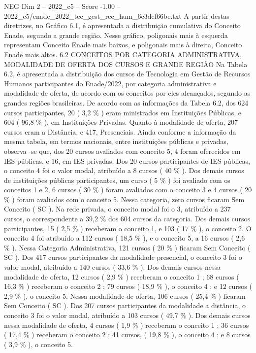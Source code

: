 \begin{textsample}{NEG Dim 2 – 2022\_c5 – Score -1.00 – 2022\_c5/enade\_2022\_tec\_gest\_rec\_hum\_6c3def66be.txt}
A partir destas diretrizes, no Gráfico 6.1, é apresentada a distribuição cumulativa do Conceito Enade, segundo a grande região.
Nesse gráfico, poligonais mais à esquerda representam Conceito Enade mais baixos, e poligonais mais à direita, Conceito Enade mais altos. 6.2 CONCEITOS POR CATEGORIA ADMINISTRATIVA, MODALIDADE DE OFERTA DOS CURSOS E GRANDE REGIÃO Na Tabela 6.2, é apresentada a distribuição dos cursos de Tecnologia em Gestão de Recursos Humanos participantes do Enade/2022, por categoria administrativa e modalidade de oferta, de acordo com os conceitos por eles alcançados, segundo as grandes regiões brasileiras.
De acordo com as informações da Tabela 6.2, dos 624 cursos participantes, 20 ( 3,2 \% ) eram ministrados em Instituições Públicas, e 604 ( 96,8 \% ), em Instituições Privadas.
Quanto à modalidade de oferta, 207 cursos eram a Distância, e 417, Presenciais.
Ainda conforme a informação da mesma tabela, em termos nacionais, entre instituições públicas e privadas, observa -se que, dos 20 cursos avaliados com conceito 5, 4 foram oferecidos em IES públicas, e 16, em IES privadas.
Dos 20 cursos participantes de IES públicas, o conceito 4 foi o valor modal, atribuído a 8 cursos ( 40 \% ).
Dos demais cursos de instituições públicas participantes, um curso ( 5 \% ) foi avaliado com os conceitos 1 e 2, 6 cursos ( 30 \% ) foram avaliados com o conceito 3 e 4 cursos ( 20 \% ) foram avaliados com o conceito 5.
Nessa categoria, zero cursos ficaram Sem Conceito ( SC ).
Na rede privada, o conceito modal foi o 3, atribuído a 237 cursos, o correspondente a 39,2 \% dos 604 cursos da categoria.
Dos demais cursos participantes, 15 ( 2,5 \% ) receberam o conceito 1, e 103 ( 17 \% ), o conceito 2.
O conceito 4 foi atribuído a 112 cursos ( 18,5 \% ), e o conceito 5, a 16 cursos ( 2,6 \% ).
Nessa Categoria Administrativa, 121 cursos ( 20 \% ) ficaram Sem Conceito ( SC ).
Dos 417 cursos participantes da modalidade presencial, o conceito 3 foi o valor modal, atribuído a 140 cursos ( 33,6 \% ).
Dos demais cursos nessa modalidade de oferta, 12 cursos ( 2,9 \% ) receberam o conceito 1 ; 68 cursos ( 16,3 \% ) receberam o conceito 2 ; 79 cursos ( 18,9 \% ), o conceito 4 ; e 12 cursos ( 2,9 \% ), o conceito 5.
Nessa modalidade de oferta, 106 cursos ( 25,4 \% ) ficaram Sem Conceito ( SC ).
Dos 207 cursos participantes da modalidade a distância, o conceito 3 foi o valor modal, atribuído a 103 cursos ( 49,7 \% ).
Dos demais cursos nessa modalidade de oferta, 4 cursos ( 1,9 \% ) receberam o conceito 1 ; 36 cursos ( 17,4 \% ) receberam o conceito 2 ; 41 cursos, ( 19,8 \% ), o conceito 4 ; e 8 cursos ( 3,9 \% ), o conceito 5.

\end{textsample}
